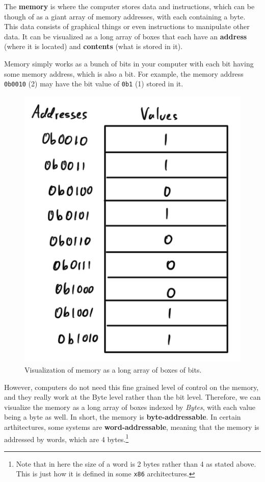   \begin{definition}[Memory]
    The \textbf{memory} is where the computer stores data and instructions, which can be though of as a giant array of memory addresses, with each containing a byte. This data consists of graphical things or even instructions to manipulate other data. It can be visualized  as a long array of boxes that each have an \textbf{address} (where it is located) and \textbf{contents} (what is stored in it).

    Memory simply works as a bunch of bits in your computer with each bit having some memory address, which is also a bit. For example, the memory address \texttt{0b0010} (2) may have the bit value of \texttt{0b1} (1) stored in it. 

    \begin{figure}[H]
      \centering 
      \includegraphics[scale=0.4]{img/memory_visual_bit.png}
      \caption{Visualization of memory as a long array of boxes of bits. }
      \label{fig:memory_visual_bit}
    \end{figure}

    However, computers do not need this fine grained level of control on the memory, and they really work at the Byte level rather than the bit level. Therefore, we can visualize the memory as a long array of boxes indexed by \textit{Bytes}, with each value being a byte as well. In short, the memory is \textbf{byte-addressable}. In certain arthitectures, some systems are \textbf{word-addressable}, meaning that the memory is addressed by words, which are 4 bytes.\footnote{Note that in here the size of a word is 2 bytes rather than 4 as stated above. This is just how it is defined in some \texttt{x86} architectures.}


\end{definition}
